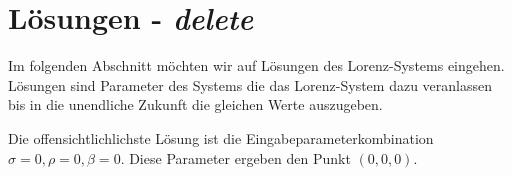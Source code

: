 
\section{Lösungen - \textit{delete}} %
Im folgenden Abschnitt möchten wir auf Lösungen des Lorenz-Systems eingehen. Lösungen sind Parameter des Systems die das Lorenz-System dazu veranlassen bis in die unendliche Zukunft die gleichen Werte auszugeben.

Die offensichtlichlichste Lösung ist die Eingabeparameterkombination $ \sigma = 0, \rho = 0, \beta = 0 $. Diese Parameter ergeben den Punkt $ (0, 0, 0) $.

